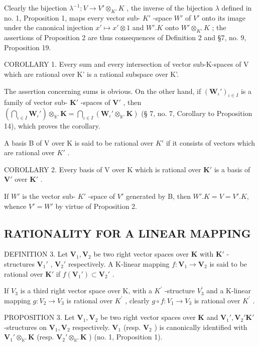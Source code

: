 Clearly the bijection \(\lambda^{-1}: V \to V' \otimes_{K'} K\) , the inverse of the bijection \(\lambda\) defined in no. 1, Proposition 1, maps every vector sub- \(K'\) -space \(W'\) of \(V'\) onto its image under the canonical injection \(x' \mapsto x' \otimes 1\) and \(W'. K\) onto \(W' \otimes_{K'} K\) ; the assertions of Proposition 2 are thus consequences of Definition 2 and §7, no. 9, Proposition 19.

COROLLARY 1. Every sum and every intersection of vector sub-K-spaces of V which are rational over K' is a rational subspace over K'.

The assertion concerning sums is obvious. On the other hand, if \((\mathbf{W}_{\iota}')_{\iota \in I}\) is a family of vector sub- \(\mathbf{K}'\) -spaces of \(\mathbf{V}'\) , then \(\left(\bigcap_{\iota \in I} \mathbf{W}_{\iota}'\right) \otimes_{\mathbb{K}'} \mathbf{K} = \bigcap_{\iota \in I} (\mathbf{W}_{\iota}' \otimes_{\mathbb{K}'} \mathbf{K})\) (§ 7, no. 7, Corollary to Proposition 14), which proves the corollary.

A basis B of V over K is said to be rational over \(K'\) if it consists of vectors which are rational over \(K'\) .

COROLLARY 2. Every basis of V over K which is rational over \(\mathbf{K}'\) is a basis of \(\mathbf{V}'\) over \(\mathbf{K}'\) .

If \(W'\) is the vector sub- \(K'\) -space of \(V'\) generated by B, then \(W'. K = V = V'. K\), whence \(V' = W'\) by virtue of Proposition 2.

\subsection{RATIONALITY FOR A LINEAR MAPPING}

DEFINITION 3. Let \(\mathbf{V}_1, \mathbf{V}_2\) be two right vector spaces over \(\mathbf{K}\) with \(\mathbf{K}'\) -structures \(\mathbf{V}_1'\) , \(\mathbf{V}_2'\) respectively. A K-linear mapping \(f: \mathbf{V}_1 \to \mathbf{V}_2\) is said to be rational over \(\mathbf{K}'\) if \(f(\mathbf{V}_1') \subset \mathbf{V}_2'\) .

If \(V_{3}\) is a third right vector space over K, with a \(K^{\prime}\) -structure \(V_{3}^{\prime}\) and a K-linear mapping \(g:V_{2}\rightarrow V_{3}\) is rational over \(K^{\prime}\) , clearly \(g\circ f:V_{1}\rightarrow V_{3}\) is rational over \(K^{\prime}\) .

PROPOSITION 3. Let \(\mathbf{V}_1, \mathbf{V}_2\) be two right vector spaces over \(\mathbf{K}\) and \(\mathbf{V}_1', \mathbf{V}_2' \mathbf{K}'\) -structures on \(\mathbf{V}_1, \mathbf{V}_2\) respectively. \(\mathbf{V}_1\) (resp. \(\mathbf{V}_2\) ) is canonically identified with \(\mathbf{V}_1' \otimes_{\mathbb{K}'} \mathbf{K}\) (resp. \(\mathbf{V}_2' \otimes_{\mathbb{K}'} \mathbf{K}\) ) (no. 1, Proposition 1).

